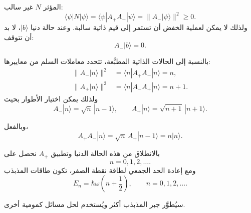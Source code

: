 المؤثر \(N\) غير سالب:
\begin{equation}
\langle\psi|N|\psi\rangle
=\langle\psi|A_+A_-|\psi\rangle
=\|A_-|\psi\rangle\|^2
\geq0.
\end{equation}
ولذلك لا يمكن لعملية الخفض أن تستمر إلى قيم ذاتية سالبة. وعند حالة دنيا \(|b\rangle\)، لا بد أن تتوقف:
\begin{equation}
A_-|b\rangle=0.
\end{equation}

بالنسبة إلى الحالات الذاتية المطبَّعة، تتحدد معاملات السلم من معاييرها:
\begin{align}
\|A_-|n\rangle\|^2
&=\langle n|A_+A_-|n\rangle=n, \\
\|A_+|n\rangle\|^2
&=\langle n|A_-A_+|n\rangle=n+1.
\end{align}
ولذلك يمكن اختيار الأطوار بحيث
\begin{equation}
A_-|n\rangle=\sqrt{n}\,|n-1\rangle,
\qquad
A_+|n\rangle=\sqrt{n+1}\,|n+1\rangle.
\end{equation}

\begin{classroomqa}
\end{classroomqa}

وبالفعل،
\begin{equation}
A_+A_-|n\rangle
=\sqrt n\,A_+|n-1\rangle
=n|n\rangle.
\end{equation}

\begin{classroomqa}
\end{classroomqa}


بالانطلاق من هذه الحالة الدنيا وتطبيق \(A_+\) نحصل على
\begin{equation}
n=0,1,2,\ldots.
\end{equation}
ومع إعادة الحد الجمعي لطاقة نقطة الصفر، تكون طاقات المذبذب
\begin{equation}
E_n=\hbar\omega\left(n+\frac{1}{2}\right),
\qquad n=0,1,2,\ldots.
\end{equation}

سيُطوَّر جبر المذبذب أكثر ويُستخدم لحل مسائل كمومية أخرى.